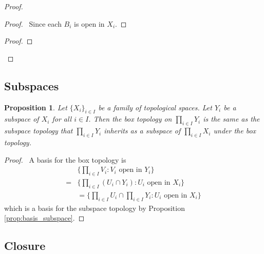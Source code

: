 \documentclass{book}
\let\qed\relax
\newtheorem{prop}[ax]{Proposition}
\theoremstyle{definition}
\begin{document}
\begin{proof}
\pf
{}
\begin{proof}
	\pf\ Since each $B_i$ is open in $X_i$.
\end{proof}
\begin{proof}
\end{proof}
\qed
\end{proof}

\subsection{Subspaces}

\begin{prop}
Let $\{X_i\}_{i \in I}$ be a family of topological spaces. Let $Y_i$ be a subspace of $X_i$ for all $i \in I$. Then the box topology on $\prod_{i \in I} Y_i$ is the same as the subspace topology that $\prod_{i \in I} Y_i$ inherits as a subspace of $\prod_{i \in I} X_i$ under the box topology.
\end{prop}

\begin{proof}
\pf\ A basis for the box topology is
\begin{align*}
& \{ \prod_{i \in I} V_i : V_i \text{ open in } Y_i \} \\
= & \{ \prod_{i \in I} (U_i \cap Y_i) : U_i \text{ open in } X_i \} \\
& = \{ \prod_{i \in I} U_i \cap \prod_{i \in I} Y_i : U_i \text{ open in } X_i \}
\end{align*}
which is a basis for the subspace topology by Proposition \ref{prop:basis_subspace}. \qed
\end{proof}

\subsection{Closure}
\end{document}
